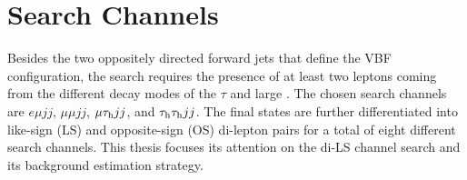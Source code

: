 \section{Search Channels}

Besides the two oppositely directed forward jets that define the VBF configuration, the search requires the presence of at least two leptons coming from the different decay modes of the $\tau$ and large \met. The chosen search channels are $e\mu jj$, $\mu\mu jj$, $\mu\tau_{\text{h}} jj$, and $\tau_{\text{h}}\tau_{\text{h}} jj$. The final states are further differentiated into like-sign (LS) and opposite-sign (OS) di-lepton pairs for a total of eight different search channels. This thesis focuses its attention on the di-\hadtau LS channel search and its background estimation strategy. 

